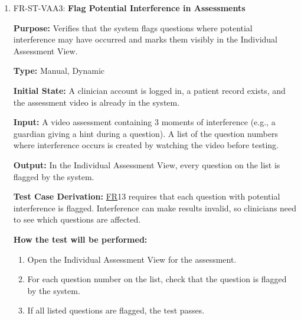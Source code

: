 \documentclass[12pt, titlepage]{article}
\newcommand{\srsfr}[1]{\href{https://github.com/Nour-Fawaz/MacaBoca/blob/main/pdfs/SRS/SRS.pdf}{FR}}
\renewcommand{\_}{\oldunderscore\allowbreak}
\begin{document}
\begin{enumerate}
  \item FR-ST-VAA3: \textbf{Flag Potential Interference in Assessments\\}
  \begin{mdframed}[linewidth=0.5mm]
      \textbf{Purpose:} Verifies that the system flags questions where potential interference may have occurred and marks them visibly in the Individual Assessment View. \par
      \textbf{Type:} Manual, Dynamic \par
      \textbf{Initial State:} A clinician account is logged in, a patient record exists, and the assessment video is already in the system. \par
      \textbf{Input:} A video assessment containing 3 moments of interference (e.g., a guardian giving a hint during a question). A list of the question numbers where interference occurs is created by watching the video before testing.  \par
      \textbf{Output:} In the Individual Assessment View, every question on the list is flagged by the system. \par
      \textbf{Test Case Derivation:} \srsfr*{13} requires that each question with potential interference is flagged. Interference can make results invalid, so clinicians need to see which questions are affected. \par
      \textbf{How the test will be performed:}
      \begin{enumerate}
        \item[1.] Open the Individual Assessment View for the assessment.
        \item[2.] For each question number on the list, check that the question is flagged by the system.
        \item[3.] If all listed questions are flagged, the test passes.
      \end{enumerate}
  \end{mdframed}


\end{enumerate}
\end{document}
